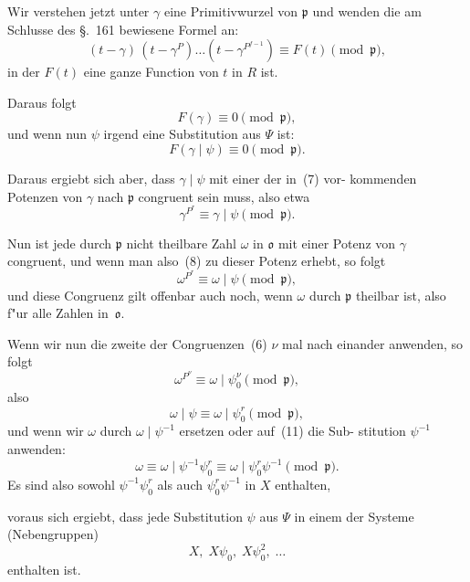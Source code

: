 \documentclass[12pt,a4paper]{article}
\theoremstyle{weber}
\begin{document}
Wir verstehen jetzt unter $\gamma$ eine Primitivwurzel von $\mathfrak{p}$ und
wenden die am Schlusse des \S.~161 bewiesene Formel an:
\begin{equation}\label{eq:s162-7}
(t-\gamma)\,(t-\gamma^P)\dots(t-\gamma^{P^{f-1}}) \equiv F(t) \pmod{\mathfrak{p}},
\end{equation}
in der $F(t)$ eine ganze Function von $t$ in $R$ ist.

Daraus folgt
\[
F(\gamma) \equiv 0 \pmod{\mathfrak{p}},
\]
und wenn nun $\psi$ irgend eine Substitution aus $\varPsi$ ist:
\[
F(\gamma \mid \psi) \equiv 0 \pmod{\mathfrak{p}}.
\]

Daraus ergiebt sich aber, dass $\gamma \mid \psi$ mit einer der in~(7) vor-
kommenden Potenzen von $\gamma$ nach $\mathfrak{p}$ congruent sein muss, also
etwa
\begin{equation}\label{eq:s162-8}
\gamma^{P^r} \equiv \gamma \mid \psi \pmod{\mathfrak{p}}.
\end{equation}

Nun ist jede durch $\mathfrak{p}$ nicht theilbare Zahl $\omega$ in $\mathfrak{o}$ mit einer
Potenz von $\gamma$ congruent, und wenn man also~(8) zu dieser Potenz
erhebt, so folgt
\begin{equation}\label{eq:s162-9}
\omega^{P^r} \equiv \omega \mid \psi \pmod{\mathfrak{p}},
\end{equation}
und diese Congruenz gilt offenbar auch noch, wenn $\omega$ durch $\mathfrak{p}$
theilbar ist, also f"ur alle Zahlen in~$\mathfrak{o}$.

Wenn wir nun die zweite der Congruenzen~(6) $\nu$ mal nach
einander anwenden, so folgt
\begin{equation}\label{eq:s162-10}
\omega^{P^\nu} \equiv \omega \mid \psi_0^\nu \pmod{\mathfrak{p}},
\end{equation}
also
\begin{equation}\label{eq:s162-11}
\omega \mid \psi \equiv \omega \mid \psi_0^r \pmod{\mathfrak{p}},
\end{equation}
und wenn wir $\omega$ durch $\omega \mid \psi^{-1}$ ersetzen oder auf~(11) die Sub-
stitution $\psi^{-1}$ anwenden:
\begin{equation}\label{eq:s162-12}
\omega \equiv \omega \mid \psi^{-1}\psi_0^r \equiv \omega \mid \psi_0^r\psi^{-1} \pmod{\mathfrak{p}}.
\end{equation}
Es sind also sowohl $\psi^{-1}\psi_0^r$ als auch $\psi_0^r\psi^{-1}$ in $X$ enthalten,

voraus sich ergiebt, dass jede Substitution $\psi$ aus $\varPsi$ in einem
der Systeme (Nebengruppen)
\[
X,\; X\psi_0,\; X\psi_0^2,\; \dots
\]
enthalten ist.
\end{document}
